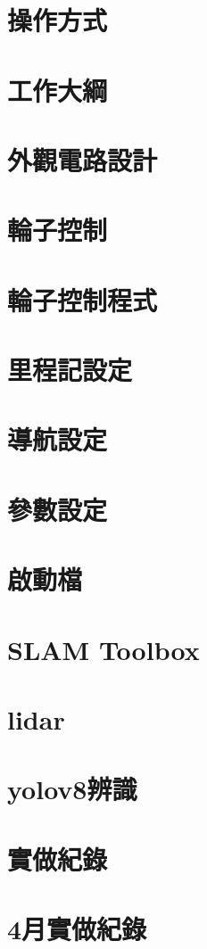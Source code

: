 \documentclass{article}
\begin{document}
\section{操作方式}

\section{工作大綱}

\section{外觀電路設計}



\clearpage
\section{輪子控制}

\section{輪子控制程式}


\section{里程記設定}

\section{導航設定}

\clearpage
\section{參數設定}

\section{啟動檔}

\section{SLAM Toolbox}

\section{lidar}

\section{yolov8辨識}


\section{實做紀錄}

\section{4月實做紀錄}

\end{document}
